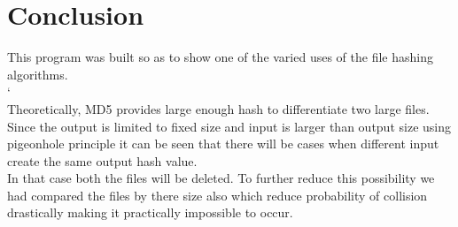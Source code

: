 \chapter{Conclusion}

This program was built so as to show one of the varied uses of the file hashing algorithms. 
\\`\\
Theoretically, MD5 provides large enough hash to differentiate two large files. Since the output is limited to fixed size and input is larger than output size using pigeonhole principle it can be seen that there will be cases when different input create the same output hash value. \\In that  case both the files will be deleted. To further  reduce this possibility we had compared the files by there size also which reduce probability of collision drastically making it practically impossible to occur.

